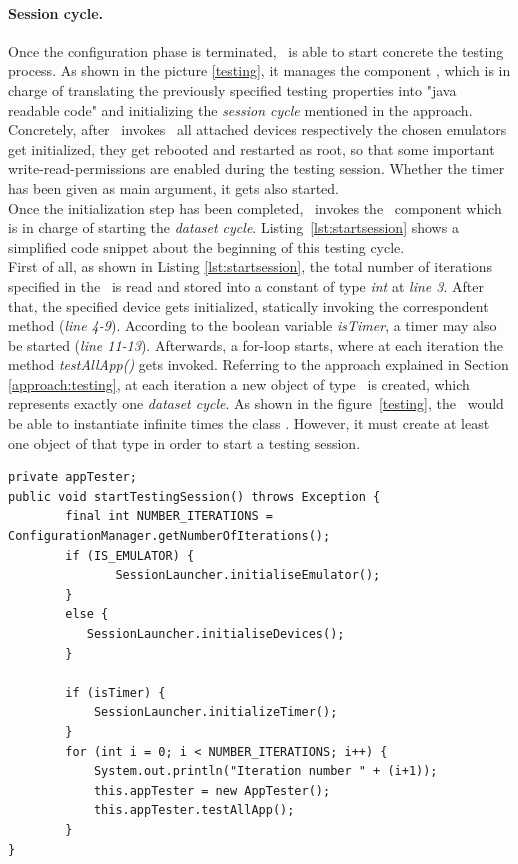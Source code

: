 \paragraph{Session cycle.} Once the configuration phase is terminated, \toolname\ is able to start concrete the testing process. 
As shown in the picture \ref{testing}, it manages the component \SessionLauncher, which is in charge of translating the previously specified testing properties into "java readable code" and initializing the \textit{session cycle} mentioned in the approach. 
Concretely, after \toolname\ invokes \SessionLauncher\ all attached devices respectively the chosen emulators get initialized, \ie they get rebooted and restarted as root, so that some important write-read-permissions are enabled during the testing session. 
Whether the timer has been given as main argument, it gets also started. \\
Once the initialization step has been completed, \SessionLauncher\  invokes the \AppTester\ component which is in charge of starting the \textit{dataset cycle}. Listing~\ref{lst:startsession} shows a simplified code snippet about the beginning of this testing cycle. \\
First of all, as shown in Listing \ref{lst:startsession}, the total number of iterations specified in the \Config\ is read and stored into a constant of type \textit{int} at \textit{line 3}. After that, the specified device gets initialized, statically invoking the correspondent method (\textit{line 4-9}).  
According to the boolean variable \textit{isTimer}, a timer may also be started (\textit{line 11-13}).
Afterwards, a for-loop starts, where at each iteration the method \textit{testAllApp()} gets invoked. 
Referring to the approach explained in Section \ref{approach:testing}, at each iteration a new object of type \AppTester\ is created, which represents exactly one \textit{dataset cycle}. 
As shown in the figure~\ref{testing}, the \SessionLauncher\ would be able to instantiate infinite times the class \AppTester. However, it must create at least one object of that type in order to start a testing session. 
\clearpage
\begin{lstlisting}[caption=\SessionLauncher\ Code snippet for starting a testing session ,label={lst:startsession}]
private appTester; 
public void startTestingSession() throws Exception {
        final int NUMBER_ITERATIONS = ConfigurationManager.getNumberOfIterations();
        if (IS_EMULATOR) {
        	   SessionLauncher.initialiseEmulator();
        }
        else {
       	   SessionLauncher.initialiseDevices();
        }
       
        if (isTimer) {
            SessionLauncher.initializeTimer();
        }
        for (int i = 0; i < NUMBER_ITERATIONS; i++) {
            System.out.println("Iteration number " + (i+1));
            this.appTester = new AppTester();
            this.appTester.testAllApp();
        }
}
\end{lstlisting}


